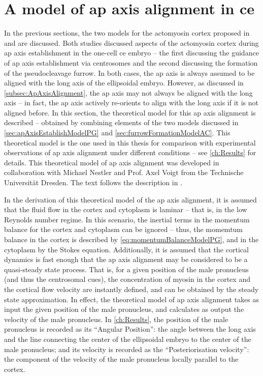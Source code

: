 \section{A model of \acs{ap} axis alignment in \acs{ce}}\label{sec:apAxisAlignmentModelMN}
In the previous sections, the two models for the actomyosin cortex proposed in \citep{gross2019guiding} and \citep{reymann2016cortical} are discussed. Both studies discussed aspects of the actomyosin cortex during \ac{ap} axis establishment in the one-cell \ac{ce} embryo -- the first discussing the guidance of \ac{ap} axis establishment via centrosomes and the second discussing the formation of the pseudocleavage furrow. In both cases, the \ac{ap} axis is always assumed to be aligned with the long axis of the ellipsoidal embryo. However, as discussed in \autoref{subsec:ApAxisAlignment}, the \ac{ap} axis may not always be aligned with the long axis -- in fact, the \ac{ap} axis actively re-orients to align with the long axis if it is not aligned before. In this section, the theoretical model for this \ac{ap} axis alignment is described -- obtained by combining elements of the two models discussed in \autoref{sec:apAxisEstablishModelPG} and \autoref{sec:furrowFormationModelAC}. This theoretical model is the one used in this thesis for comparison with experimental observations of \ac{ap} axis alignment under different conditions -- see \autoref{ch:Results} for details. This theoretical model of \ac{ap} axis alignment was developed in collaboration with Michael Nestler and Prof. Axel Voigt from the Technische Universit{\"a}t Dresden. The text follows the description in \citep{axisConvergence}.

In the derivation of this theoretical model of the \ac{ap} axis alignment, it is assumed that the fluid flow in the cortex and cytoplasm is laminar -- that is, in the low Reynolds number regime. In this scenario, the inertial terms in the momentum balance for the cortex and cytoplasm can be ignored -- thus, the momemtum balance in the cortex is described by \autoref{eq:momentumBalanceModelPG}, and in the cytoplasm by the Stokes equation. Additionally, it is assumed that the cortical dynamics is fast enough that the \ac{ap} axis alignment may be considered to be a quasi-steady state process. That is, for a given position of the male pronucleus (and thus the centrosomal cues), the concentration of myosin in the cortex and the cortical flow velocity are instantly defined, and can be obtained by the steady state approximation. In effect, the theoretical model of \ac{ap} axis alignment takes as input the given position of the male pronucleus, and calculates as output the velocity of the male pronucleus. In \autoref{ch:Results}, the position of the male pronucleus is recorded as its \enquote{Angular Position}: the angle between the long axis and the line connecting the center of the ellipsoidal embryo to the center of the male pronucleus; and its velocity is recorded as the \enquote{Posteriorisation velocity}: the component of the velocity of the male pronucleus locally parallel to the cortex. 

